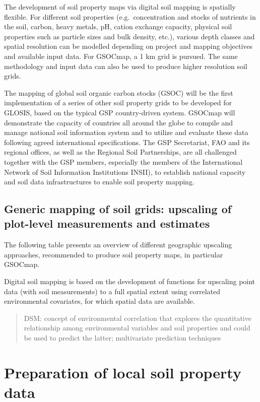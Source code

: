 \documentclass[]{book}
\theoremstyle{definition}
\theoremstyle{definition}
\theoremstyle{definition}
\theoremstyle{remark}
\begin{document}
The development of soil property maps via digital soil mapping is
spatially flexible. For different soil properties (e.g.~concentration
and stocks of nutrients in the soil, carbon, heavy metals, pH, cation
exchange capacity, physical soil properties such as particle sizes and
bulk density, etc.), various depth classes and spatial resolution can be
modelled depending on project and mapping objectives and available input
data. For GSOCmap, a 1 km grid is pursued. The same methodology and
input data can also be used to produce higher resolution soil grids.

The mapping of global soil organic carbon stocks (GSOC) will be the
first implementation of a series of other soil property grids to be
developed for GLOSIS, based on the typical GSP country-driven system.
GSOCmap will demonstrate the capacity of countries all around the globe
to compile and manage national soil information system and to utilize
and evaluate these data following agreed international specifications.
The GSP Secretariat, FAO and its regional offices, as well as the
Regional Soil Partnerships, are all challenged together with the GSP
members, especially the members of the International Network of Soil
Information Institutions INSII), to establish national capacity and soil
data infrastructures to enable soil property mapping.

\section{Generic mapping of soil grids: upscaling of plot-level
measurements and
estimates}\label{generic-mapping-of-soil-grids-upscaling-of-plot-level-measurements-and-estimates}

The following table presents an overview of different geographic
upscaling approaches, recommended to produce soil property maps, in
particular GSOCmap.

Digital soil mapping is based on the development of functions for
upscaling point data (with soil measurements) to a full spatial extent
using correlated environmental covariates, for which spatial data are
available.

\begin{quote}
DSM: concept of environmental correlation that explores the quantitative
relationship among environmental variables and soil properties and could
be used to predict the latter; multivariate prediction techniques
\end{quote}

\chapter{Preparation of local soil property
data}\label{preparation-of-local-soil-property-data}
\end{document}
